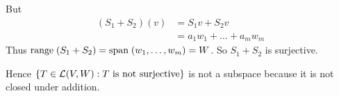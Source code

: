 \documentclass[a5paper]{article}
\begin{document}
But
\begin{align*}
    (S_1 + S_2)(v) &= S_1v + S_2v                       \\
                   &= a_1w_1 + \dots + a_mw_m
\end{align*}
Thus $\text{range\;} (S_1 + S_2) = \text{span\;}(w_1,\dots,w_m) = W$.
So $S_1 + S_2$ is surjective.

Hence $\left\{ T \in \mathcal{L}(V,W) : T \text{ is not surjective} \right\}$ is not a subspace because it is not closed under addition.
\end{document}
